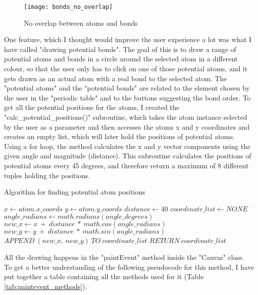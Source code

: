 \documentclass[a4paper,12pt]{article}
\begin{document}
\begin{figure} [h]
	\centering
	\texttt{[image: bonds\_no\_overlap]}
	\caption{No overlap between atoms and bonds}
	\label{fig:bonds_no_overlap}
\end{figure}

One feature, which I thought would improve the user experience a lot was what I have called "drawing potential bonds". The goal of this is to draw a range of potential atoms and bonds in a circle around the selected atom in a different colour, so that the user only has to click on one of those potential atoms, and it gets drawn as an actual atom with a real bond to the selected atom. The "potential atoms" and the "potential bonds" are related to the element chosen by the user in the "periodic table" and to the buttons suggesting the bond order. To get all the potential positions for the atoms, I created the "calc\_potential\_positions()" subroutine, which takes the atom instance selected by the user as a parameter and then accesses the atoms x and y coordinates and creates an empty list, which will later hold the positions of potential atoms. Using a for loop, the method calculates the x and y vector components using the given angle and magnitude (distance). This subroutine calculates the positions of potential atoms every 45 degrees, and therefore return a maximum of 8 different tuples holding the positions.

\begin{algorithm}
\footnotesize
\caption{Algorithm for finding potential atom positions}\label{alg:calc_potential_pos}
\begin{algorithmic}
\State $ x\gets atom.x\_coords$
\State $ y\gets atom.y\_coords$
\State $ distance\gets 40$
\State $ coordinate\_list\gets NONE$
	\State $ angle\_radians\gets math.radians(angle\_degrees)$
	\State $ new\_x\gets x\ +\ distance\ *\ math.cos(angle\_radians)$
	\State $ new\_y\gets y\ +\ distance\ *\ math.sin(angle\_radians)$
	\State $ APPEND\ (new\_x,\ new\_y)\ TO\ coordinate\_list$
\EndFor
\State $ RETURN\ coordinate\_list$
\EndFunction
\end{algorithmic}
\end{algorithm}

All the drawing happens in the "paintEvent" method inside the "Canvas" class. To get a better understanding of the following pseudocode for this method, I have put together a table containing all the methods used for it (Table \ref{tab:paintevent_methods}).
\end{document}
